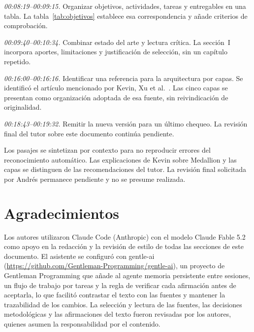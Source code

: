 \documentclass[journal]{IEEEtran}
\begin{document}
\textit{00:08:19--00:09:15.} Organizar objetivos, actividades, tareas y entregables en una tabla. La tabla~\ref{tab:objetivos} establece esa correspondencia y añade criterios de comprobación.

\textit{00:09:40--00:10:34.} Combinar estado del arte y lectura crítica. La sección~I incorpora aportes, limitaciones y justificación de selección, sin un capítulo repetido.

\textit{00:16:00--00:16:16.} Identificar una referencia para la arquitectura por capas. Se identificó el artículo mencionado por Kevin, Xu et al.~\cite{xu2024}. Las cinco capas se presentan como organización adoptada de esa fuente, sin reivindicación de originalidad.

\textit{00:18:43--00:19:32.} Remitir la nueva versión para un último chequeo. La revisión final del tutor sobre este documento continúa pendiente.

Los pasajes se sintetizan por contexto para no reproducir errores del reconocimiento automático. Las explicaciones de Kevin sobre Medallion y las capas se distinguen de las recomendaciones del tutor. La revisión final solicitada por Andrés permanece pendiente y no se presume realizada.

\section*{Agradecimientos}

Los autores utilizaron Claude Code (Anthropic) con el modelo Claude Fable 5.2 como apoyo en la redacción y la revisión de estilo de todas las secciones de este documento. El asistente se configuró con gentle-ai (\url{https://github.com/Gentleman-Programming/gentle-ai}), un proyecto de Gentleman Programming que añade al agente memoria persistente entre sesiones, un flujo de trabajo por tareas y la regla de verificar cada afirmación antes de aceptarla, lo que facilitó contrastar el texto con las fuentes y mantener la trazabilidad de los cambios. La selección y lectura de las fuentes, las decisiones metodológicas y las afirmaciones del texto fueron revisadas por los autores, quienes asumen la responsabilidad por el contenido.
\end{document}
